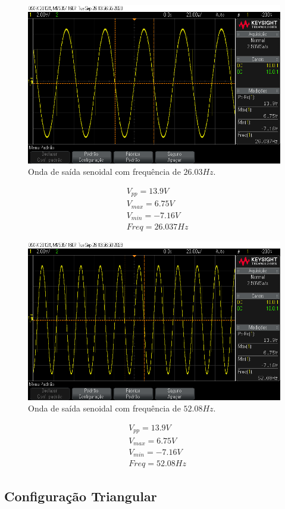 \begin{figure}[H]
    \centering
    \includegraphics[width=0.5\columnwidth]{images/senoide_1.png}
    \caption{Onda de saída senoidal com frequência de $26.03Hz$.}
\end{figure}

\begin{equation}
    \begin{aligned}
         & V_{pp} = 13.9 V    \\
         & V_{max} = 6.75 V   \\
         & V_{min} =  -7.16 V \\
         & Freq = 26.037 Hz
    \end{aligned}
\end{equation}

\begin{figure}[H]
    \centering
    \includegraphics[width=0.5\columnwidth]{images/senoide_0.png}
    \caption{Onda de saída senoidal com frequência de $52.08Hz$.}
\end{figure}

\begin{equation}
    \begin{aligned}
         & V_{pp} = 13.9 V    \\
         & V_{max} = 6.75 V   \\
         & V_{min} =  -7.16 V \\
         & Freq = 52.08 Hz
    \end{aligned}
\end{equation}

\newpage

\subsection{Configuração Triangular}

